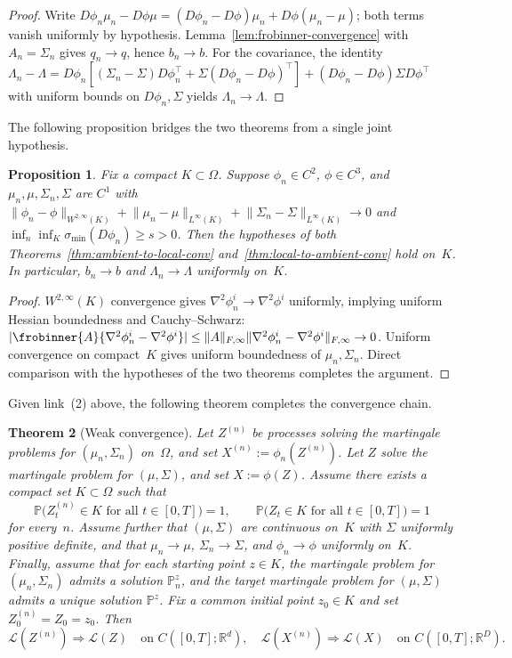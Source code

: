 \documentclass[11pt]{article}
\newcommand{\Prob}{\mathbb{P}}
\newcommand{\cL}{\mathcal{L}}
\newcommand{\Om}{\Omega}
\newcommand{\Rd}{\mathbb{R}^d}
\newcommand{\RD}{\mathbb{R}^D}
\newcommand{\norm}[1]{\lVert#1\rVert}
\newcommand{\abs}[1]{|#1|}
\newcommand{\sigmin}{\sigma_{\min}}
\newtheorem{thm}{Theorem}[section]
\newtheorem{prop}[thm]{Proposition}
\begin{document}
\begin{proof}
Write
$D\phi_n\mu_n-D\phi\mu
=(D\phi_n-D\phi)\mu_n+D\phi(\mu_n-\mu)$;
both terms vanish uniformly by hypothesis.
Lemma~\ref{lem:frobinner-convergence} with
$A_n=\Sigma_n$ gives $q_n\to q$, hence $b_n\to b$.
For the covariance, the identity
$\Lambda_n-\Lambda
=D\phi_n[(\Sigma_n-\Sigma)D\phi_n^\top
+\Sigma(D\phi_n-D\phi)^\top]
+(D\phi_n-D\phi)\Sigma D\phi^\top$
with uniform bounds on $D\phi_n,\Sigma$ yields
$\Lambda_n\to\Lambda$.
\end{proof}

The following proposition bridges the two theorems
from a single joint hypothesis.

\begin{prop}\label{prop:strong-assumption-bridge}
Fix a compact $K\subset\Om$.
Suppose $\phi_n\in C^2$, $\phi\in C^3$, and
$\mu_n,\mu,\Sigma_n,\Sigma$ are $C^1$ with
$\norm{\phi_n-\phi}_{W^{2,\infty}(K)}
+\norm{\mu_n-\mu}_{L^\infty(K)}
+\norm{\Sigma_n-\Sigma}_{L^\infty(K)}\to 0$
and $\inf_n\inf_K\sigmin(D\phi_n)\ge s>0$.
Then the hypotheses of both
Theorems~\ref{thm:ambient-to-local-conv}
and~\ref{thm:local-to-ambient-conv} hold on~$K$.
In particular, $b_n\to b$ and $\Lambda_n\to\Lambda$
uniformly on~$K$.
\end{prop}

\begin{proof}
$W^{2,\infty}(K)$ convergence gives
$\nabla^2\phi_n^i\to\nabla^2\phi^i$ uniformly,
implying uniform Hessian boundedness and
Cauchy--Schwarz:
$\abs{\frobinner{A}{\nabla^2\phi_n^i-\nabla^2\phi^i}}
\le\norm{A}_{F,\infty}\norm{\nabla^2\phi_n^i
-\nabla^2\phi^i}_{F,\infty}\to 0$.
Uniform convergence on compact~$K$ gives uniform
boundedness of $\mu_n,\Sigma_n$.
Direct comparison with the hypotheses of the two
theorems completes the argument.
\end{proof}

Given link~(2) above, the following theorem
completes the convergence chain.

\begin{thm}[Weak convergence]\label{thm:weak-convergence}
Let $Z^{(n)}$ be processes solving the martingale problems for
$(\mu_n,\Sigma_n)$ on~$\Om$, and set
$X^{(n)}:=\phi_n(Z^{(n)})$.
Let $Z$ solve the martingale problem for $(\mu,\Sigma)$, and set
$X:=\phi(Z)$.
Assume there exists a compact set $K\subset \Om$ such that
\[
  \Prob\bigl(Z_t^{(n)}\in K \text{ for all } t\in[0,T]\bigr)=1,
  \qquad
  \Prob\bigl(Z_t\in K \text{ for all } t\in[0,T]\bigr)=1
\]
for every~$n$.
Assume further that $(\mu,\Sigma)$ are continuous on~$K$ with
$\Sigma$ uniformly positive definite, and that
$\mu_n\to\mu$, $\Sigma_n\to\Sigma$, and $\phi_n\to\phi$
uniformly on~$K$.
Finally, assume that for each starting point $z\in K$, the martingale
problem for $(\mu_n,\Sigma_n)$ admits a solution $\Prob_n^z$, and the
target martingale problem for $(\mu,\Sigma)$ admits a unique solution
$\Prob^z$.
Fix a common initial point $z_0\in K$ and set
$Z_0^{(n)}=Z_0=z_0$.
Then
\[
  \cL(Z^{(n)}) \Rightarrow \cL(Z)
  \quad\text{on } C([0,T];\Rd), \quad  \cL(X^{(n)}) \Rightarrow \cL(X)
  \quad\text{on } C([0,T];\RD).
\]
\end{thm}
\end{document}
